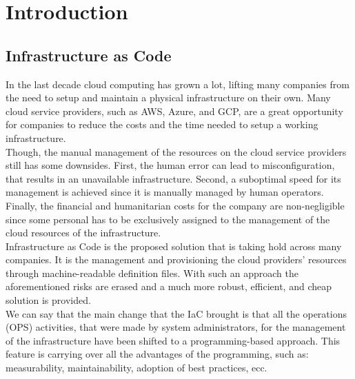 
\chapter{Introduction}
\label{cap:introduction}


\section{Infrastructure as Code}
In the last decade \gls{cloud computing} has grown a lot, lifting many companies from the need to setup and maintain a physical infrastructure on their own.
Many cloud service providers, such as \gls{AWS}, \gls{Azure}, and \gls{GCP}, are a great opportunity for companies to reduce the costs and the time needed to setup a working infrastructure.\\
Though, the manual management of the resources on the cloud service providers still has some downsides. 
First, the human error can lead to misconfiguration, that results in an unavailable infrastructure.
Second, a suboptimal speed for its management is achieved since it is manually managed by human operators.
Finally, the financial and humanitarian costs for the company are non-negligible since some personal has to be exclusively assigned to the management of the cloud resources of the infrastructure.\\
Infrastructure as Code is the proposed solution that is taking hold across many companies.
It is the management and provisioning the cloud providers' resources through machine-readable definition files.
With such an approach the aforementioned risks are erased and a much more robust, efficient, and cheap solution is provided.\\
We can say that the main change that the IaC brought is that all the operations (OPS) activities, that were made by system administrators, for the management of the infrastructure have been shifted to a programming-based approach.
This feature is carrying over all the advantages of the programming, such as: measurability, maintainability, adoption of best practices, ecc.

